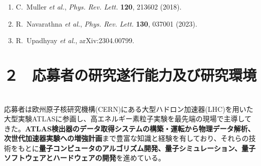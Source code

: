 \documentclass[11pt,a4j,dvipdfmx]{jarticle} 					%
\newcommand{\研究課題名}{誤り耐性量子コンピュータに向けた誤り訂正技術の開発(仮)}
\newcommand{\研究機関名}{東京大学}
\newcommand{\研究代表者氏名}{寺師弘二}
\newcommand{\研究期間の最終元号年度}{10}  %
\newcommand{\mybf}[1]{{\bfseries\sffamily#1}}
\begin{document}
\begin{enumerate}
	\item \label{JJ_Muller} %
		C.~Muller {\it et al.}, {\it Phys. Rev. Lett.} {\bf 120}, 213602 (2018).\vspace{-3mm}
        \item \label{JJ_circulator} %
		R.~Navarathna {\it et al.}, {\it Phys. Rev. Lett.} {\bf 130}, 037001 (2023).\vspace{-3mm}
        \item \label{JJ_reciprocle} %
                R.~Upadhyay {\it et al.}, arXiv:2304.00799.\vspace{-3mm}
		
\end{enumerate}





\section{２　応募者の研究遂行能力及び研究環境}

\\
応募者は欧州原子核研究機構(CERN)にある大型ハドロン加速器(LHC)を用いた大型実験ATLASに参画し、高エネルギー素粒子実験を最先端の現場で主導してきた。\mybf{ATLAS検出器のデータ取得システムの構築・運転から物理データ解析、次世代加速器実験への増強計画}まで豊富な知識と経験を有しており、それらの技術をもとに\mybf{量子コンピュータのアルゴリズム開発、量子シミュレーション、量子ソフトウェアとハードウェアの開発}を進めている。\vspace{-2mm}\\
\end{document}
